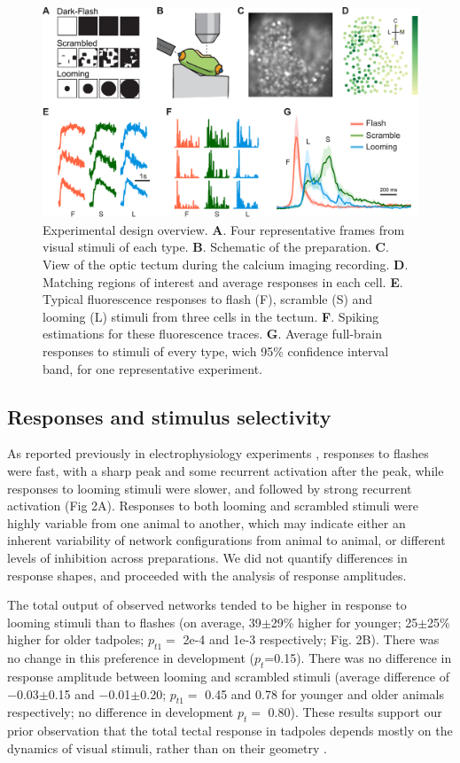\documentclass{article}
\begin{document}
\begin{figure}[t!]
\includegraphics[width=\linewidth]{fig1.pdf}
\caption{
Experimental design overview. \textbf{A}. Four representative frames from visual stimuli of each type. \textbf{B}. Schematic of the preparation. \textbf{C}. View of the optic tectum during the calcium imaging recording. \textbf{D}. Matching regions of interest and average responses in each cell. \textbf{E}. Typical fluorescence responses to flash (F), scramble (S) and looming (L) stimuli from three cells in the tectum. \textbf{F}. Spiking estimations for these fluorescence traces. \textbf{G}. Average full-brain responses to stimuli of every type, wich 95\% confidence interval band, for one representative experiment. }
\end{figure}

\subsection*{Responses and stimulus selectivity}

As reported previously in electrophysiology experiments \citep{khakhalin2014}, responses to flashes were fast, with a sharp peak and some recurrent activation after the peak, while responses to looming stimuli were slower, and followed by strong recurrent activation (Fig 2A). Responses to both looming and scrambled stimuli were highly variable from one animal to another, which may indicate either an inherent variability of network configurations from animal to animal, or different levels of inhibition across preparations. We did not quantify differences in response shapes, and proceeded with the analysis of response amplitudes.

The total output of observed networks tended to be higher in response to looming stimuli than to flashes (on average, 39$\pm$29\% higher for younger; 25$\pm$25\% higher for older tadpoles; $p_{t1}=$ 2e-4 and 1e-3 respectively; Fig. 2B). There was no change in this preference in development ($p_t$=0.15). There was no difference in response amplitude between looming and scrambled stimuli (average difference of $-$0.03$\pm$0.15 and $-$0.01$\pm$0.20; $p_{t1}=$ 0.45 and 0.78 for younger and older animals respectively; no difference in development $p_t=$ 0.80). These results support our prior observation that the total tectal response in tadpoles depends mostly on the dynamics of visual stimuli, rather than on their geometry \citep{khakhalin2014,jang2016}.
\end{document}
